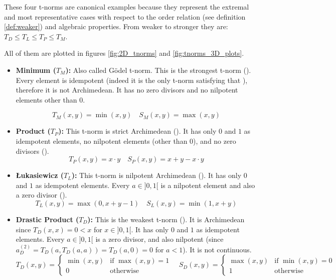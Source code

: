   \begin{example}\label{ex:basic_tnorms}
    These four t-norms are canonical examples because they represent the extremal and most representative cases with respect to the order relation (see definition \ref{def:weaker}) and algebraic properties. From weaker to stronger they are: $T_D \leq T_L \leq T_P \leq T_M$. 
    
    All of them are plotted in figures \ref{fig:2D_tnorms} and \ref{fig:tnorms_3D_plots}.
      \begin{itemize}
        \item \textbf{Minimum ($T_M$):} Also called Gödel t-norm.
            This is the strongest t-norm (\cite[Rem.~1.5(i)]{Klement2000}). Every element is idempotent (indeed it is the only t-norm satisfying that \cite[Lem.~1.2.3]{FULLER2} ), therefore it is not Archimedean. It has no zero divisors and no nilpotent elements other than 0.
    
        \[T_M(x, y) = \min(x, y) \quad S_M(x, y) = \max(x, y)
    \]
        \item \textbf{Product ($T_P$):} 
        This t-norm is strict Archimedean (\cite[Ex.~2.14(i)]{Klement2000}). It has only $0$ and $1$ as idempotent elements, no nilpotent elements (other than $0$), and no zero divisors (\cite[Ex.~2.2(i)]{Klement2000}).
        \[T_P(x, y) = x \cdot y \quad S_P(x, y) = x + y - x \cdot y\]
        \item \textbf{Łukasiewicz ($T_L$):} 
        This t-norm is nilpotent Archimedean (\cite[Ex.~2.14(i)]{Klement2000}). It has only $0$ and $1$ as idempotent elements. Every $a \in ]0,1[$ is a nilpotent element and also a zero divisor (\cite[Ex.~2.2(i)]{Klement2000}).
        \[T_L(x, y) = \max(0, x + y - 1) \quad S_L(x, y) = \min(1, x + y)\]
        \item \textbf{Drastic Product ($T_D$):} This is the weakest t-norm (\cite[Rem.~1.5(i)]{Klement2000}). It is Archimedean since $T_D(x,x)=0 < x$ for $x \in ]0,1[$. It has only $0$ and $1$ as idempotent elements. Every $a \in ]0,1[$ is a zero divisor, and also nilpotent (since $a_D^{(2)} = T_D(a, T_D(a,a)) = T_D(a,0) = 0$ for $a<1$). It is not continuous.
        \[T_D(x, y) = \begin{cases} \min(x,y) & \text{if } \max(x,y)=1 \\ 0 & \text{otherwise} \end{cases} \quad S_D(x, y) = \begin{cases} \max(x,y) & \text{if } \min(x,y)=0 \\ 1 & \text{otherwise} \end{cases}\]
      \end{itemize}
    \end{example}



